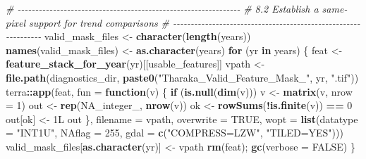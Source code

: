 \documentclass[
]{article}
\newenvironment{Shaded}{\begin{snugshade}}{\end{snugshade}}
\newcommand{\AttributeTok}[1]{\textcolor[rgb]{0.13,0.29,0.53}{#1}}
\newcommand{\CommentTok}[1]{\textcolor[rgb]{0.56,0.35,0.01}{\textit{#1}}}
\newcommand{\ConstantTok}[1]{\textcolor[rgb]{0.56,0.35,0.01}{#1}}
\newcommand{\ControlFlowTok}[1]{\textcolor[rgb]{0.13,0.29,0.53}{\textbf{#1}}}
\newcommand{\DataTypeTok}[1]{\textcolor[rgb]{0.13,0.29,0.53}{#1}}
\newcommand{\DecValTok}[1]{\textcolor[rgb]{0.00,0.00,0.81}{#1}}
\newcommand{\FunctionTok}[1]{\textcolor[rgb]{0.13,0.29,0.53}{\textbf{#1}}}
\newcommand{\NormalTok}[1]{#1}
\newcommand{\OtherTok}[1]{\textcolor[rgb]{0.56,0.35,0.01}{#1}}
\newcommand{\SpecialCharTok}[1]{\textcolor[rgb]{0.81,0.36,0.00}{\textbf{#1}}}
\newcommand{\StringTok}[1]{\textcolor[rgb]{0.31,0.60,0.02}{#1}}
\begin{document}
\begin{Shaded}
\begin{Highlighting}[]
\CommentTok{\# {-}{-}{-}{-}{-}{-}{-}{-}{-}{-}{-}{-}{-}{-}{-}{-}{-}{-}{-}{-}{-}{-}{-}{-}{-}{-}{-}{-}{-}{-}{-}{-}{-}{-}{-}{-}{-}{-}{-}{-}{-}{-}{-}{-}{-}{-}{-}{-}{-}{-}{-}{-}{-}{-}{-}{-}{-}{-}{-}{-}{-}{-}{-}}
\CommentTok{\# 8.2 Establish a same{-}pixel support for trend comparisons}
\CommentTok{\# {-}{-}{-}{-}{-}{-}{-}{-}{-}{-}{-}{-}{-}{-}{-}{-}{-}{-}{-}{-}{-}{-}{-}{-}{-}{-}{-}{-}{-}{-}{-}{-}{-}{-}{-}{-}{-}{-}{-}{-}{-}{-}{-}{-}{-}{-}{-}{-}{-}{-}{-}{-}{-}{-}{-}{-}{-}{-}{-}{-}{-}{-}{-}}
\NormalTok{valid\_mask\_files }\OtherTok{\textless{}{-}} \FunctionTok{character}\NormalTok{(}\FunctionTok{length}\NormalTok{(years))}
\FunctionTok{names}\NormalTok{(valid\_mask\_files) }\OtherTok{\textless{}{-}} \FunctionTok{as.character}\NormalTok{(years)}
\ControlFlowTok{for}\NormalTok{ (yr }\ControlFlowTok{in}\NormalTok{ years) \{}
\NormalTok{  feat }\OtherTok{\textless{}{-}} \FunctionTok{feature\_stack\_for\_year}\NormalTok{(yr)[[usable\_features]]}
\NormalTok{  vpath }\OtherTok{\textless{}{-}} \FunctionTok{file.path}\NormalTok{(diagnostics\_dir, }\FunctionTok{paste0}\NormalTok{(}\StringTok{"Tharaka\_Valid\_Feature\_Mask\_"}\NormalTok{, yr, }\StringTok{".tif"}\NormalTok{))}
\NormalTok{  terra}\SpecialCharTok{::}\FunctionTok{app}\NormalTok{(feat, }\AttributeTok{fun =} \ControlFlowTok{function}\NormalTok{(v) \{}
    \ControlFlowTok{if}\NormalTok{ (}\FunctionTok{is.null}\NormalTok{(}\FunctionTok{dim}\NormalTok{(v))) v }\OtherTok{\textless{}{-}} \FunctionTok{matrix}\NormalTok{(v, }\AttributeTok{nrow =} \DecValTok{1}\NormalTok{)}
\NormalTok{    out }\OtherTok{\textless{}{-}} \FunctionTok{rep}\NormalTok{(}\ConstantTok{NA\_integer\_}\NormalTok{, }\FunctionTok{nrow}\NormalTok{(v))}
\NormalTok{    ok }\OtherTok{\textless{}{-}} \FunctionTok{rowSums}\NormalTok{(}\SpecialCharTok{!}\FunctionTok{is.finite}\NormalTok{(v)) }\SpecialCharTok{==} \DecValTok{0}
\NormalTok{    out[ok] }\OtherTok{\textless{}{-}} \DecValTok{1}\DataTypeTok{L}
\NormalTok{    out}
\NormalTok{  \}, }\AttributeTok{filename =}\NormalTok{ vpath, }\AttributeTok{overwrite =} \ConstantTok{TRUE}\NormalTok{,}
     \AttributeTok{wopt =} \FunctionTok{list}\NormalTok{(}\AttributeTok{datatype =} \StringTok{"INT1U"}\NormalTok{, }\AttributeTok{NAflag =} \DecValTok{255}\NormalTok{, }\AttributeTok{gdal =} \FunctionTok{c}\NormalTok{(}\StringTok{"COMPRESS=LZW"}\NormalTok{, }\StringTok{"TILED=YES"}\NormalTok{)))}
\NormalTok{  valid\_mask\_files[}\FunctionTok{as.character}\NormalTok{(yr)] }\OtherTok{\textless{}{-}}\NormalTok{ vpath}
  \FunctionTok{rm}\NormalTok{(feat); }\FunctionTok{gc}\NormalTok{(}\AttributeTok{verbose =} \ConstantTok{FALSE}\NormalTok{)}
\NormalTok{\}}
\end{Highlighting}
\end{Shaded}
\end{document}
